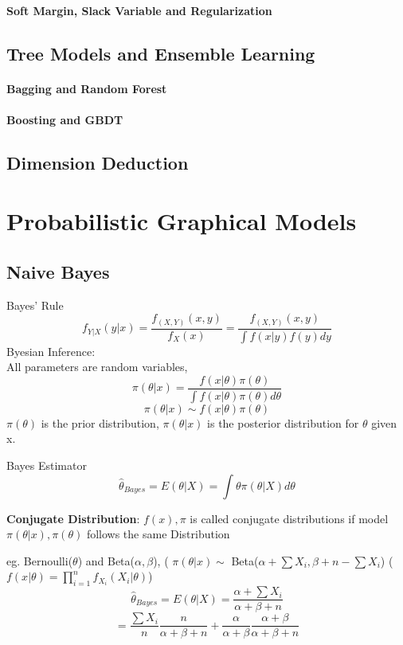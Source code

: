\documentclass[11pt, openany]{book}              %
\begin{document}
\subsection{Soft Margin, Slack Variable and Regularization}

\chapter{Tree Models and Ensemble Learning}

\subsection{Bagging and Random Forest}
\subsection{Boosting and GBDT}

\chapter{Dimension Deduction}


\part{Probabilistic Graphical Models}

\chapter{Naive Bayes}

Bayes' Rule 
$$ f_{Y|X}(y|x) = \frac{f_{(X,Y)}(x,y)}{f_X(x)} = \frac{f_{(X,Y)}(x,y)}{\int f(x|y)f(y)dy}$$
Byesian Inference:\\
All parameters are random variables,
$$\pi(\theta|x) =  \frac{f(x|\theta) \pi(\theta)}{\int f(x|\theta)\pi(\theta)d\theta}$$
$$\pi(\theta|x) \sim  f(x|\theta) \pi(\theta)$$
$\pi(\theta)$ is the prior distribution, $\pi(\theta|x)$ is the posterior distribution for $\theta$ given x. 

Bayes Estimator
$$\hat{\theta}_{Bayes} = E(\theta | X) = \int \theta \pi(\theta |X ) d\theta$$

\textbf{Conjugate Distribution}:
$f(x), \pi$ is called conjugate distributions if model $\pi(\theta|x), \pi(\theta)$ follows the same Distribution

eg. Bernoulli($\theta$) and Beta($\alpha,\beta$),  ( $\pi(\theta|x) \sim$ Beta($\alpha+\sum X_i, \beta + n - \sum X_i$) ($f(x|\theta) = \prod_{i=1}^n f_{X_i}(X_i|\theta)$)
$$\hat{\theta}_{Bayes} = E(\theta | X) = \frac{ \alpha + \sum X_i}{ \alpha + \beta + n} $$
$$= \frac{\sum X_i}{n}\frac{n}{\alpha + \beta + n} + \frac{\alpha}{\alpha + \beta}\frac{ \alpha + \beta}{\alpha + \beta + n}$$
\end{document}
